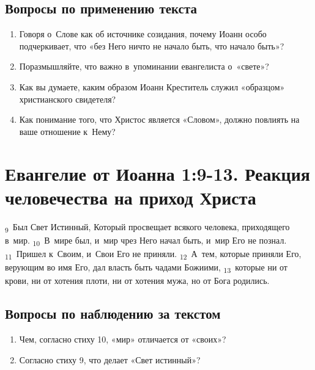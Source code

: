 \documentclass[a4paper,12pt]{article}
\begin{document}
\subsection*{Вопросы по применению текста}

\begin{enumerate}
    \item Говоря о~Слове как об источнике созидания, почему Иоанн особо подчеркивает, что «без Него ничто не начало быть, что начало быть»?
    
    \myline
    
    \myline

    \item Поразмышляйте, что важно в~упоминании евангелиста о~«свете»? 
    
    \myline
    
    \myline
    
    \item Как вы думаете, каким образом Иоанн Креститель служил «образцом» христианского свидетеля? 
    
    \myline
    
    \myline
    
    \item Как понимание того, что Христос является «Словом», должно повлиять на ваше отношение к~Нему?
    
    \myline
    
    \myline

\end{enumerate}



\section{Евангелие от Иоанна 1:9-13. Реакция человечества на приход Христа}

\textsubscript{9}~Был Свет Истинный, Который просвещает всякого человека, приходящего в~мир. \textsubscript{10}~В~мире был, и~мир чрез Него начал быть, и~мир Его не познал. \textsubscript{11}~Пришел к~Своим, и~Свои Его не приняли. \textsubscript{12}~А~тем, которые приняли Его, верующим во имя Его, дал власть быть чадами Божиими, \textsubscript{13}~которые ни от крови, ни от хотения плоти, ни от хотения мужа, но от Бога родились.

\subsection*{Вопросы по наблюдению за текстом}
\begin{enumerate}
    \item Чем, согласно стиху 10, «мир» отличается от «своих»? 
    
    \myline
    
    \myline

    \item Согласно стиху 9, что делает «Свет истинный»?

    \myline
    
    \myline   
\end{enumerate}
\end{document}
